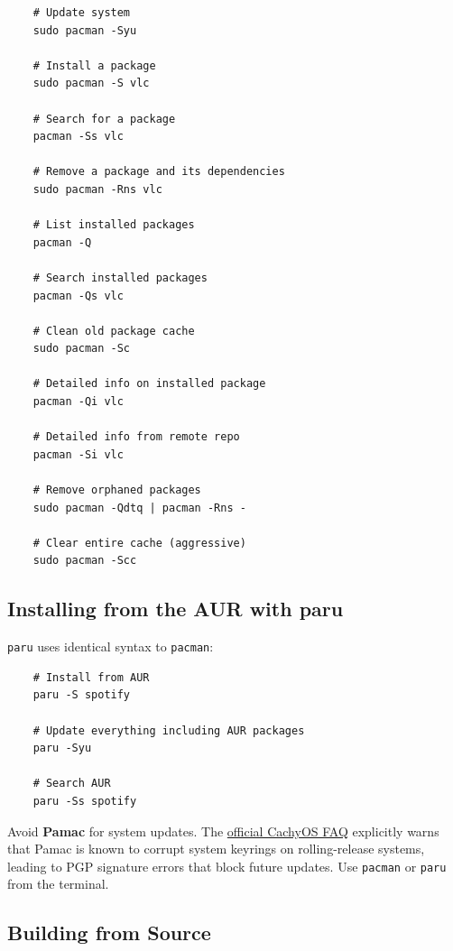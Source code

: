 \documentclass{article}
\newcommand{\code}[1]{\colorbox{codebg}{\texttt{#1}}}
\begin{document}
\begin{verbatim}
	# Update system
	sudo pacman -Syu
	
	# Install a package
	sudo pacman -S vlc
	
	# Search for a package
	pacman -Ss vlc
	
	# Remove a package and its dependencies
	sudo pacman -Rns vlc
	
	# List installed packages
	pacman -Q
	
	# Search installed packages
	pacman -Qs vlc
	
	# Clean old package cache
	sudo pacman -Sc
	
	# Detailed info on installed package
	pacman -Qi vlc
	
	# Detailed info from remote repo
	pacman -Si vlc
	
	# Remove orphaned packages
	sudo pacman -Qdtq | pacman -Rns -
	
	# Clear entire cache (aggressive)
	sudo pacman -Scc
\end{verbatim}

\subsection{Installing from the AUR with paru}

\code{paru} uses identical syntax to \code{pacman}:

\begin{verbatim}
	# Install from AUR
	paru -S spotify
	
	# Update everything including AUR packages
	paru -Syu
	
	# Search AUR
	paru -Ss spotify
\end{verbatim}

\begin{tcolorbox}[arc=12pt, outer arc=10pt,
	colback=red!5!white, colframe=red!60!black,
	title=\textbf{Warning}]
	Avoid \textbf{Pamac} for system updates. The
	\href{https://wiki.cachyos.org/cachyos_basic/faq/}{official CachyOS FAQ}
	explicitly warns that Pamac is known to corrupt system keyrings on rolling-release
	systems, leading to PGP signature errors that block future updates. Use
	\code{pacman} or \code{paru} from the terminal.
\end{tcolorbox}

\subsection{Building from Source}
\end{document}
